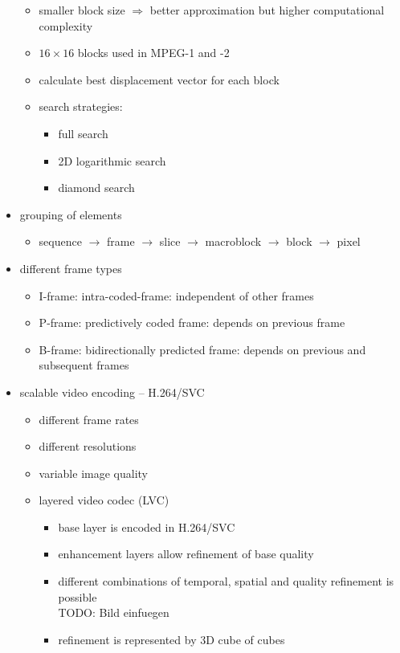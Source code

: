 \documentclass[a4paper,10pt]{scrreprt}
\begin{document}
\begin{itemize}
\begin{itemize}
  \item smaller block size $\Rightarrow$ better approximation but higher computational complexity
  \item $16 \times 16 $ blocks used in MPEG-1 and -2
  \item calculate best displacement vector for each block
  \item search strategies:
  \begin{itemize}
   \item full search
   \item 2D logarithmic search
   \item diamond search
  \end{itemize}
 \end{itemize}
\item grouping of elements
  \begin{itemize}
   \item sequence $\rightarrow$ frame $\rightarrow$ slice $\rightarrow$ macroblock $\rightarrow$ block $\rightarrow$ pixel
  \end{itemize}
 \item different frame types 
 \begin{itemize}
  \item I-frame: intra-coded-frame: independent of other frames 
  \item P-frame: predictively coded frame: depends on previous frame 
  \item B-frame: bidirectionally predicted frame: depends on previous and subsequent frames 
 \end{itemize}
 \item scalable video encoding -- H.264/SVC
 \begin{itemize}
  \item different frame rates
  \item different resolutions
  \item variable image quality 
  \item layered video codec (LVC)
  \begin{itemize}
   \item base layer is encoded in H.264/SVC
   \item enhancement layers allow refinement of base quality 
   \item different combinations of temporal, spatial and quality refinement is possible
   \\ TODO: Bild einfuegen
   \item refinement is represented by 3D cube of cubes 
  \end{itemize}

\end{itemize}
\end{itemize}
\end{document}
